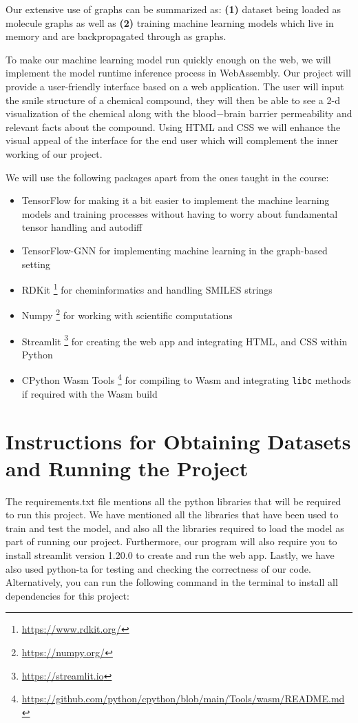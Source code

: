 \documentclass[fontsize=11pt]{article}
\begin{document}
Our extensive use of graphs can be summarized as: \textbf{(1)} dataset being loaded as molecule graphs as well as \textbf{(2)} training machine learning models which live in memory and are backpropagated through as graphs.

To make our machine learning model run quickly enough on the web, we will implement the model runtime inference process in WebAssembly. Our project will provide a user-friendly interface based on a web application. The user will input the smile structure of a chemical compound, they will then be able to see a 2-d visualization of the chemical along with the blood$-$brain barrier permeability and relevant facts about the compound. Using HTML and CSS we will enhance the visual appeal of the interface for the end user which will complement the inner working of our project.

We will use the following packages apart from the ones taught in the course:
\begin{itemize}
    \item TensorFlow \citep{abadi2016tensorflow} for making it a bit easier to implement the machine learning models and training processes without having to worry about fundamental tensor handling and autodiff
    \item TensorFlow-GNN \citep{ferludin2022tf} for implementing machine learning in the graph-based setting
    \item RDKit \footnote{\url{https://www.rdkit.org/}} for cheminformatics and handling SMILES strings
    \item Numpy \footnote{\url{https://numpy.org/}} for working with scientific computations
    \item Streamlit \footnote{\url{https://streamlit.io}} for creating the web app and integrating HTML, and CSS within Python
    \item CPython Wasm Tools \footnote{\url{https://github.com/python/cpython/blob/main/Tools/wasm/README.md}} for compiling to Wasm and integrating \texttt{libc} methods if required with the Wasm build
\end{itemize}

\section*{Instructions for Obtaining Datasets and Running the Project}

The requirements.txt file mentions all the python libraries that will be required to run this project. We have mentioned all the libraries that have been used to train and test the model, and also all the libraries required to load the model as part of running our project. Furthermore, our program will also require you to install streamlit version 1.20.0 to create and run the web app. Lastly, we have also used python-ta for testing and checking the correctness of our code. Alternatively, you can run the following command in the terminal to install all dependencies for this project:
\end{document}
